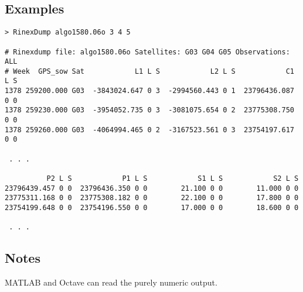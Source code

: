 \subsection{Examples}
\begin{\outputsize}
\begin{lstlisting}
> RinexDump algo1580.06o 3 4 5

# Rinexdump file: algo1580.06o Satellites: G03 G04 G05 Observations: ALL
# Week  GPS_sow Sat            L1 L S            L2 L S            C1 L S
1378 259200.000 G03  -3843024.647 0 3  -2994560.443 0 1  23796436.087 0 0
1378 259230.000 G03  -3954052.735 0 3  -3081075.654 0 2  23775308.750 0 0
1378 259260.000 G03  -4064994.465 0 2  -3167523.561 0 3  23754197.617 0 0

 . . .

          P2 L S            P1 L S            S1 L S            S2 L S
23796439.457 0 0  23796436.350 0 0        21.100 0 0        11.000 0 0
23775311.168 0 0  23775308.182 0 0        22.100 0 0        17.800 0 0
23754199.648 0 0  23754196.550 0 0        17.000 0 0        18.600 0 0

 . . .
\end{lstlisting}
\end{\outputsize}

\subsection{Notes}
MATLAB and Octave can read the purely numeric output.

%
